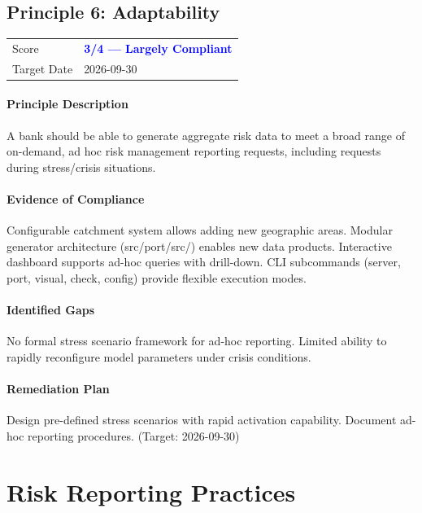 \documentclass[11pt]{article}
\begin{document}
\subsection{Principle 6: Adaptability}

\begin{table}[H]
    \centering
    \begin{tabular}{ll}
        \toprule
        Score & \textcolor{blue}{\textbf{3/4 --- Largely Compliant}} \\
        Target Date & 2026-09-30 \\
        \bottomrule
    \end{tabular}
\end{table}

\paragraph{Principle Description}
A bank should be able to generate aggregate risk data to meet a broad range of on-demand, ad hoc risk management reporting requests, including requests during stress/crisis situations.

\paragraph{Evidence of Compliance}
Configurable catchment system allows adding new geographic areas. Modular generator architecture (src/port/src/) enables new data products. Interactive dashboard supports ad-hoc queries with drill-down. CLI subcommands (server, port, visual, check, config) provide flexible execution modes.

\paragraph{Identified Gaps}
No formal stress scenario framework for ad-hoc reporting. Limited ability to rapidly reconfigure model parameters under crisis conditions.

\paragraph{Remediation Plan}
Design pre-defined stress scenarios with rapid activation capability. Document ad-hoc reporting procedures. (Target: 2026-09-30)

\clearpage

\section{Risk Reporting Practices}
\end{document}
